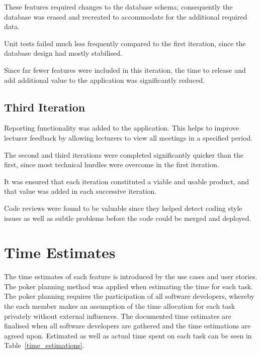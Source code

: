 \documentclass[11pt, a4paper]{article}
\begin{document}
	These features required changes to the database schema; consequently the database was erased and recreated to accommodate for the additional required data.
	
	Unit tests failed much less frequently compared to the first iteration, since the database design had mostly stabilised.
	
	Since far fewer features were included in this iteration, the time to release and add additional value to the application was significantly reduced.
	\subsection{Third Iteration}
	Reporting functionality was added to the application. This helps to improve lecturer feedback by allowing lecturers to view all meetings in a specified period.
	
	The second and third iterations were completed significantly quicker than the first, since most technical hurdles were overcome in the first iteration.
	
	It was ensured that each iteration constituted a viable and usable product, and that value was added in each successive iteration.
	
	Code reviews were found to be valuable since they helped detect coding style issues as well as subtle problems before the code could be merged and deployed.
	
	\section{Time Estimates}
	The time estimates of each feature is introduced by the use cases and user stories. The poker planning method was applied when estimating the time for each task. The poker planning requires the participation of all software developers, whereby the each member makes an assumption of the time allocation for each task privately without external influences. The documented time estimates are finalised when all software developers are gathered and the time estimations are agreed upon. Estimated as well as actual time spent on each task can be seen in Table~\ref{time_estimations}.
	
\end{document}
